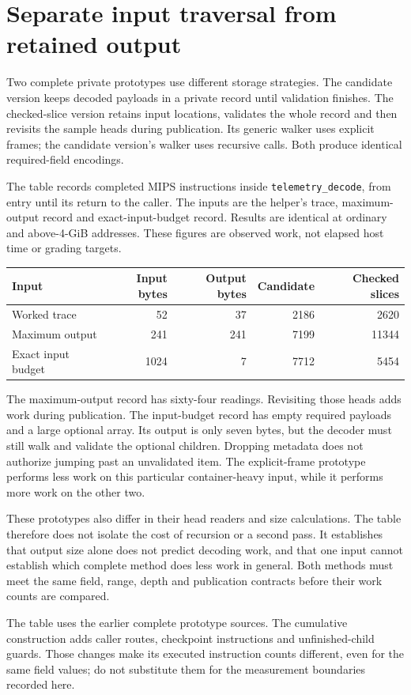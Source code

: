 \section{Separate input traversal from retained output}
Two complete private prototypes use different storage strategies. The candidate version
keeps decoded payloads in a private record until validation finishes. The checked-slice
version retains input locations, validates the whole record and then revisits the sample
heads during publication. Its generic walker uses explicit frames; the candidate
version's walker uses recursive calls. Both produce identical required-field encodings.

The table records completed MIPS instructions inside \texttt{telemetry\_decode}, from
entry until its return to the caller. The inputs are the helper's trace, maximum-output
record and exact-input-budget record. Results are identical at ordinary and above-4-GiB
addresses. These figures are observed work, not elapsed host time or grading targets.

\begin{center}
  \begin{tabular}{lrrrr}
    Input              & Input bytes & Output bytes & Candidate & Checked slices \\
    \hline
    Worked trace       & 52          & 37           & 2186      & 2620           \\
    Maximum output     & 241         & 241          & 7199      & 11344          \\
    Exact input budget & 1024        & 7            & 7712      & 5454           \\
  \end{tabular}
\end{center}

The maximum-output record has sixty-four readings. Revisiting those heads adds work
during publication. The input-budget record has empty required payloads and a large
optional array. Its output is only seven bytes, but the decoder must still walk and
validate the optional children. Dropping metadata does not authorize jumping past an
unvalidated item. The explicit-frame prototype performs less work on this particular
container-heavy input, while it performs more work on the other two.

These prototypes also differ in their head readers and size calculations. The table
therefore does not isolate the cost of recursion or a second pass. It establishes that
output size alone does not predict decoding work, and that one input cannot establish
which complete method does less work in general. Both methods must meet the same field,
range, depth and publication contracts before their work counts are compared.

The table uses the earlier complete prototype sources. The cumulative construction
adds caller routes, checkpoint instructions and unfinished-child guards. Those changes
make its executed instruction counts different, even for the same field values; do
not substitute them for the measurement boundaries recorded here.
